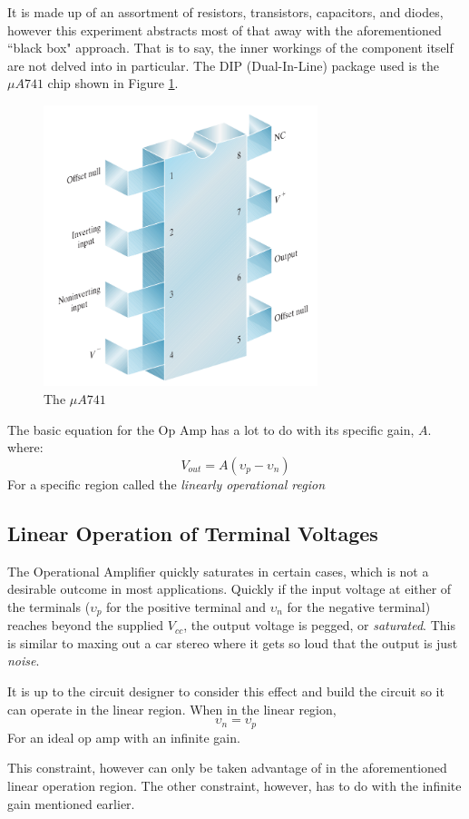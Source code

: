 \documentclass[12pt]{article}
\begin{document}
It is made up of an assortment of resistors, transistors, capacitors, and
diodes, however this experiment abstracts most of that away with the
aforementioned ``black box" approach. That is to say, the inner workings of the
component itself are not delved into in particular. The DIP (Dual-In-Line)
package used is the \(\mu A 741\) chip shown in Figure \ref{741}.
\begin{figure}[H]
	\centering
	\includegraphics[width=8cm]{02_1}
	\caption{The \(\mu A 741\) }
	\label{741}
\end{figure}
The basic equation for the Op Amp has a lot to do with its specific gain, \(A\).
where:
\[
	V_{out} = A(\upsilon_p - \upsilon_n)
\]
For a specific region called the \textit{linearly operational region}

\subsection{Linear Operation of Terminal Voltages}
The Operational Amplifier quickly saturates in certain cases, which is not a
desirable outcome in most applications. Quickly if the input voltage at either
of the terminals (\(\upsilon_p\) for the positive terminal and \(\upsilon_n\)
for the negative terminal)  reaches beyond the supplied \(V_{cc}\), the output
voltage is pegged, or \textit{saturated}. This is similar to maxing out a car
stereo where it gets so loud that the output is just \textit{noise}.

It is up to the circuit designer to consider this effect and build the circuit
so it can operate in the linear region. When in the linear region,
\[
	\upsilon_n = \upsilon_p
\]
For an ideal op amp with an infinite gain.

This constraint, however can only be taken advantage of in the aforementioned
linear operation region. The other constraint, however, has to do with the
infinite gain mentioned earlier.
\end{document}
